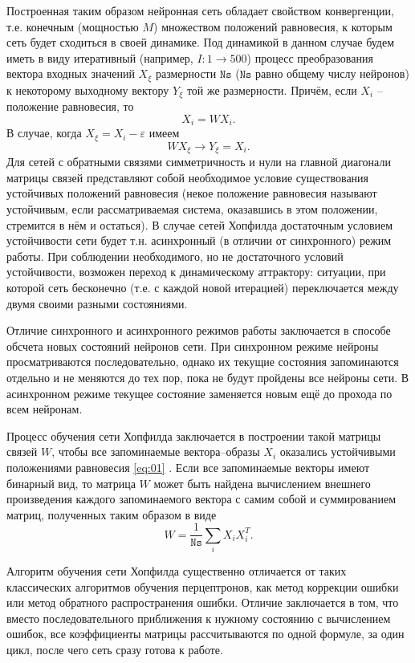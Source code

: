\documentclass[12pt,a4paper]{article}
\newcommand*{\SavedEqref}{}
\let\SavedEqref\eqref
\renewcommand*{\eqref}[1]{%
	\begingroup
	\hypersetup{
		linkcolor=linkequation,
		linkbordercolor=linkequation,
	}%
	\SavedEqref{#1}%
	\endgroup
}
\newcommand{\ns}{\texttt{Ns}}
\begin{document}
Построенная таким образом нейронная сеть обладает свойством конвергенции, т.е. конечным (мощностью $M$) множеством положений равновесия, к которым сеть будет сходиться в своей динамике. 
Под динамикой в данном случае будем иметь в виду итеративный 
(например, $I: 1\rightarrow500$) процесс преобразования вектора входных значений $X_{\xi}$ размерности $\ns$ ($\ns$ равно общему числу нейронов) к некоторому выходному вектору $Y_{\xi}$ той же размерности. 
Причём, если $X_i$ -- положение равновесия, то
\begin{equation}\label{eq:01}
X_i = WX_i.
\end{equation}
В случае, когда $X_{\xi} = X_i - \varepsilon$ имеем
$$
WX_{\xi}\rightarrow Y_{\xi}=X_i.
$$	
Для сетей с обратными связями симметричность и нули на главной 
диагонали матрицы связей представляют собой необходимое условие \cite{hopfield1982} существования устойчивых положений равновесия 
(некое положение равновесия называют устойчивым, если рассматриваемая система, оказавшись в этом положении, стремится в нём и остаться). 
В случае сетей Хопфилда достаточным условием устойчивости сети 
будет т.н. асинхронный (в отличии от синхронного) режим работы. 
При соблюдении необходимого, но не достаточного условий устойчивости, возможен переход к динамическому аттрактору: ситуации, при которой 
сеть бесконечно (т.е. с каждой новой итерацией) переключается между
двумя своими разными состояниями.

Отличие синхронного и асинхронного режимов работы заключается в способе обсчета новых состояний нейронов сети. При синхронном режиме нейроны просматриваются последовательно, однако их текущие состояния запоминаются отдельно и не меняются до тех пор, пока не будут пройдены все нейроны сети. В асинхронном режиме текущее состояние заменяется новым ещё до прохода по всем нейронам.

Процесс обучения сети Хопфилда заключается в построении такой матрицы связей $W$, чтобы все запоминаемые вектора--образы $X_i$ оказались устойчивыми положениями равновесия \eqref{eq:01}. Если все запоминаемые векторы имеют бинарный вид, то матрица $W$ может быть найдена вычислением внешнего произведения каждого запоминаемого вектора с самим собой и суммированием матриц, полученных таким образом в виде
$$
W = \dfrac{1}{\ns}\sum\limits_i X_iX_i^T.
$$

Алгоритм обучения сети Хопфилда существенно отличается от таких классических алгоритмов обучения перцептронов, как метод коррекции ошибки или метод обратного распространения ошибки. Отличие заключается в том, что вместо последовательного приближения к нужному состоянию с вычислением ошибок, все коэффициенты матрицы рассчитываются по одной формуле, за один цикл, после чего сеть сразу готова к работе.
\end{document}
